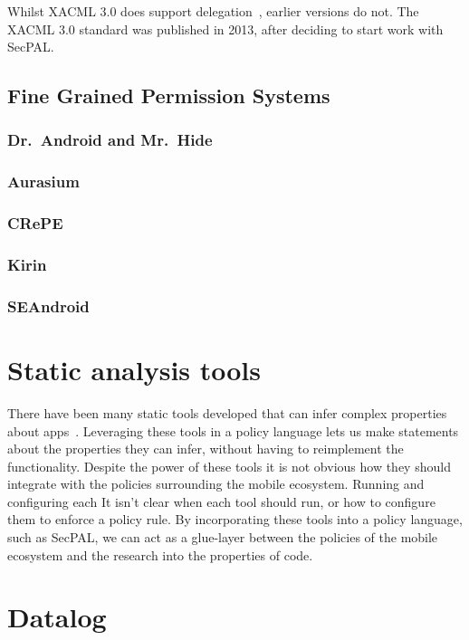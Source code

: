 \documentclass[thesis.tex]{subfiles}
\begin{document}
Whilst XACML 3.0 does support delegation~\cite{oasis_xacml_2010}, earlier
versions do not. The XACML 3.0 standard was published in 2013, after deciding to
start work with SecPAL.


\subsection{Fine Grained Permission Systems}
\subsubsection{Dr.~Android and Mr.~Hide}
\subsubsection{Aurasium}
\subsubsection{CRePE}
\subsubsection{Kirin}
\subsubsection{SEAndroid}

\section{Static analysis tools}

There have been many static tools developed that can infer complex
properties about
apps~\cite{felt_android_2011,song_integrated_2016,antonin_carette_investigating_2017,schmidt_static_2009,enck_taintdroid:_2014}.
Leveraging these tools in a policy language lets us make statements about the
properties they can infer, without having to reimplement the functionality.
Despite the power of these tools it is not obvious how they should integrate
with the policies surrounding the mobile ecosystem. Running and configuring each
It isn't clear when each tool should run, or how to configure them to enforce a
policy rule. By incorporating these tools into a policy language, such as
SecPAL, we can act as a glue-layer between the policies of the mobile ecosystem
and the research into the properties of code.

\section{Datalog}
\label{ssec:datalog}
\end{document}
